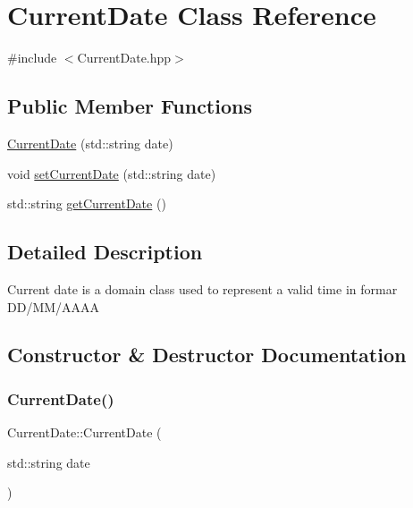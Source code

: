 \hypertarget{class_current_date}{}\section{Current\+Date Class Reference}
\label{class_current_date}


{\ttfamily \#include $<$Current\+Date.\+hpp$>$}

\subsection*{Public Member Functions}
\begin{DoxyCompactItemize}
\item 
\mbox{\hyperlink{class_current_date_a9fa53e4dbb4aeb1d398cc5ac6f267a08}{Current\+Date}} (std\+::string date)
\item 
void \mbox{\hyperlink{class_current_date_a01fbf35d387f69df1a16eb9899b5c9ab}{set\+Current\+Date}} (std\+::string date)
\item 
std\+::string \mbox{\hyperlink{class_current_date_a8a58d6806adbdad8ce9741fc628bbcbf}{get\+Current\+Date}} ()
\end{DoxyCompactItemize}


\subsection{Detailed Description}
Current date is a domain class used to represent a valid time in formar D\+D/\+M\+M/\+A\+A\+AA 

\subsection{Constructor \& Destructor Documentation}
\mbox{\label{class_current_date_a9fa53e4dbb4aeb1d398cc5ac6f267a08}} 
\subsubsection{\texorpdfstring{CurrentDate()}{CurrentDate()}}
{\footnotesize\ttfamily Current\+Date\+::\+Current\+Date (\begin{DoxyParamCaption}\item[{std\+::string}]{date }\end{DoxyParamCaption})}



